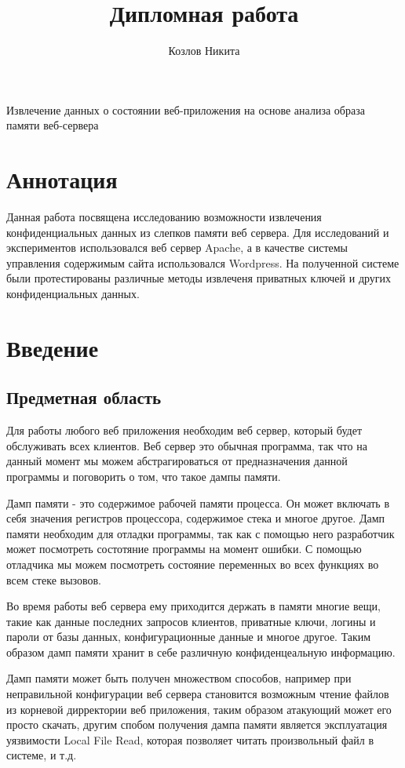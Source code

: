 \documentclass[20pt]{article}
\title{Дипломная работа}
\author{Козлов Никита}
\begin{document}
{\huge Извлечение данных о состоянии веб-приложения на основе анализа образа памяти веб-сервера}

\newpage

\section*{Аннотация}
Данная работа посвящена исследованию возможности извлечения конфиденциальных данных из слепков памяти веб сервера. Для исследований и экспериментов использовался веб сервер Apache, а в качестве системы управления содержимым сайта использовался Wordpress. На полученной системе были протестированы
различные методы извлеченя приватных ключей и других конфиденциальных данных.

\newpage

\tableofcontents

\newpage

\section{Введение}

\subsection{Предметная область}
Для работы любого веб приложения необходим веб сервер, который будет обслуживать
всех клиентов. Веб сервер это обычная программа, так что на данный момент мы можем
абстрагироваться от предназначения данной программы и поговорить о том, что такое
дампы памяти.

Дамп памяти - это содержимое рабочей памяти процесса. Он может включать в себя
значения регистров процессора, содержимое стека и многое другое. Дамп памяти
необходим для отладки программы, так как с помощью него разработчик
может посмотреть состотяние программы на момент ошибки. С помощью отладчика мы
можем посмотреть состояние переменных во всех функциях во всем стеке вызовов.

Во время работы веб сервера ему приходится держать в памяти многие вещи, такие
как данные последних запросов клиентов, приватные ключи, логины и пароли от базы
данных, конфигурационные данные и многое другое. Таким образом дамп памяти
хранит в себе различную конфиденцеальную информацию.

Дамп памяти может быть получен множеством способов, например при неправильной
конфигурации веб сервера становится возможным чтение файлов из корневой
дирректории веб приложения, таким образом атакующий может его просто скачать,
другим спобом получения дампа памяти является эксплуатация уязвимости Local File
Read, которая позволяет читать произвольный файл в системе, и т.д.
\end{document}
